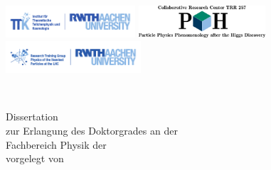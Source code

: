 
\begin{titlepage}
    \begin{addmargin}[-1cm]{-3cm}
	    \begin{center}

	        \includegraphics[height=1.2cm]{logos/rwth_ttk_de_rgb.pdf}
	        \hfill
	        \includegraphics[height=1.2cm]{logos/p3h_logo_exa_sites_vertical_text.png}
	        \hfill
					\includegraphics[height=1.2cm]{logos/rwth_gk_physik_der_schwersten_teilchen_lhc_logo_en_rgb.pdf}
	        \hfill
	        \vfill

	        \begingroup
	        	\LARGE
	        	\color{RWTHblau}
	        	{\scshape \myTitle}\\
	        \endgroup

	        \vspace{2.5cm}
	        \Large
	        {Dissertation}\\
	        \vspace{0.5cm}
	        {zur Erlangung des Doktorgrades an der \myFaculty}\\
			\vspace{0.5cm}
	        {Fachbereich Physik der \myUniGenitiv}\\
	        \vspace{0.5cm}
	        {vorgelegt von}\\
	        \vspace{1.5cm}
	        \Large
	        {\scshape \myName}
	        \Large

	        \vfill
	        {\myLocation}\\
	        {\myTime}\\

	        \vfill


    	\end{center}
	\end{addmargin}
\end{titlepage}
